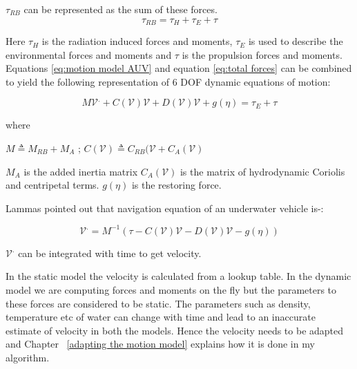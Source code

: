 \documentclass[12pt]{dalcsthesis}
\begin{document}
$\tau_{RB}$ can be represented as the sum of these forces.
\begin{equation}
\label{eq:total forces}
 \tau_{RB} = \tau_{H} + \tau_{E} + \tau 
\end{equation}

Here $\tau_{H}$ is the radiation induced forces and moments, $\tau_{E}$ is used to describe the environmental forces and moments and $\tau$ is the propulsion forces and moments. Equations \ref{eq:motion model AUV} and equation \ref{eq:total forces} can be combined to yield the following representation of 6 DOF dynamic equations of motion:
 

\begin{equation}
\label{eq:vehicle hydrodynamics}
M\mathcal{{V}}^{.}+C(\mathcal{V})\mathcal{V}+D(\mathcal{V})\mathcal{V}+g(\eta)=\tau_{E}+\tau%
\end{equation}

where 

$M \triangleq M_{RB} + M_{A}$ ; $C(\mathcal{V}) \triangleq C_{RB}(\mathcal{V} + C_{A}(\mathcal{V})$

$M_A$ is the added inertia  matrix $C_{A}(\mathcal{V})$ is the matrix of hydrodynamic Coriolis and centripetal terms. $g(\eta)$ is the restoring force.

Lammas \cite{Lammas2004} pointed out that navigation equation of an underwater vehicle is-:

\begin{equation}
\label{eq-: navigation equation for AUV}
\mathcal{V}^{.} = M^{-1}(\tau-C(\mathcal{V})\mathcal{V}-D(\mathcal{V})\mathcal{V}-g(\eta))
\end{equation}


$\mathcal{V}^{.}$ can be integrated with time to get velocity.

In the static model the velocity is calculated from a lookup table. In the dynamic model we are computing forces and moments on the fly but the parameters to these forces are considered to be static. The parameters such as density, temperature etc of water can change with time and lead to an inaccurate estimate of velocity in both the models. Hence the velocity needs to be adapted and Chapter ~\ref{adapting the motion model} explains how it is done in my algorithm.    
\end{document}
